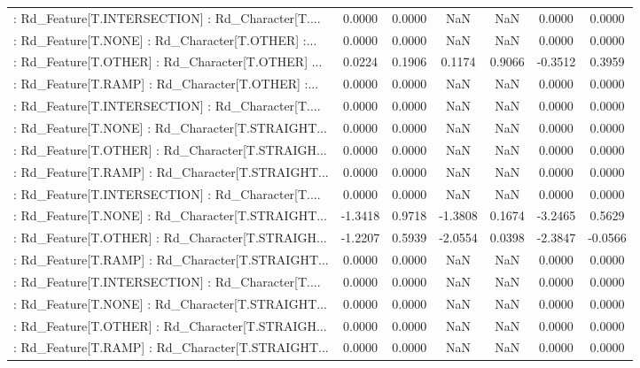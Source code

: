 \begin{longtable}{p{4cm}cccccc}
 : Rd\_Feature[T.INTERSECTION] : Rd\_Character[T.... &  0.0000 &    0.0000 &     NaN &          NaN &  0.0000 &  0.0000 \\
 : Rd\_Feature[T.NONE] : Rd\_Character[T.OTHER] :... &  0.0000 &    0.0000 &     NaN &          NaN &  0.0000 &  0.0000 \\
 : Rd\_Feature[T.OTHER] : Rd\_Character[T.OTHER] ... &  0.0224 &    0.1906 &  0.1174 &       0.9066 & -0.3512 &  0.3959 \\
 : Rd\_Feature[T.RAMP] : Rd\_Character[T.OTHER] :... &  0.0000 &    0.0000 &     NaN &          NaN &  0.0000 &  0.0000 \\
 : Rd\_Feature[T.INTERSECTION] : Rd\_Character[T.... &  0.0000 &    0.0000 &     NaN &          NaN &  0.0000 &  0.0000 \\
 : Rd\_Feature[T.NONE] : Rd\_Character[T.STRAIGHT... &  0.0000 &    0.0000 &     NaN &          NaN &  0.0000 &  0.0000 \\
 : Rd\_Feature[T.OTHER] : Rd\_Character[T.STRAIGH... &  0.0000 &    0.0000 &     NaN &          NaN &  0.0000 &  0.0000 \\
 : Rd\_Feature[T.RAMP] : Rd\_Character[T.STRAIGHT... &  0.0000 &    0.0000 &     NaN &          NaN &  0.0000 &  0.0000 \\
 : Rd\_Feature[T.INTERSECTION] : Rd\_Character[T.... &  0.0000 &    0.0000 &     NaN &          NaN &  0.0000 &  0.0000 \\
 : Rd\_Feature[T.NONE] : Rd\_Character[T.STRAIGHT... & -1.3418 &    0.9718 & -1.3808 &       0.1674 & -3.2465 &  0.5629 \\
 : Rd\_Feature[T.OTHER] : Rd\_Character[T.STRAIGH... & -1.2207 &    0.5939 & -2.0554 &       0.0398 & -2.3847 & -0.0566 \\
 : Rd\_Feature[T.RAMP] : Rd\_Character[T.STRAIGHT... &  0.0000 &    0.0000 &     NaN &          NaN &  0.0000 &  0.0000 \\
 : Rd\_Feature[T.INTERSECTION] : Rd\_Character[T.... &  0.0000 &    0.0000 &     NaN &          NaN &  0.0000 &  0.0000 \\
 : Rd\_Feature[T.NONE] : Rd\_Character[T.STRAIGHT... &  0.0000 &    0.0000 &     NaN &          NaN &  0.0000 &  0.0000 \\
 : Rd\_Feature[T.OTHER] : Rd\_Character[T.STRAIGH... &  0.0000 &    0.0000 &     NaN &          NaN &  0.0000 &  0.0000 \\
 : Rd\_Feature[T.RAMP] : Rd\_Character[T.STRAIGHT... &  0.0000 &    0.0000 &     NaN &          NaN &  0.0000 &  0.0000 \\

\end{longtable}
